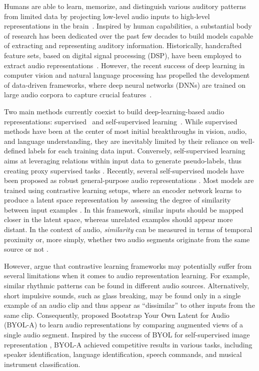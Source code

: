 

Humans are able to learn, memorize, and distinguish various auditory patterns from limited data by projecting low-level audio inputs to high-level representations in the brain~\citep{griffiths1999human}. Inspired by human capabilities, a substantial body of research has been dedicated over the past few decades to build models capable of extracting and representing auditory information. Historically, handcrafted feature sets, based on digital signal processing (DSP), have been employed to extract audio representations~\citep{liu1998audio, eyben2010opensmile}. However, the recent success of deep learning in computer vision and natural language processing has propelled the development of data-driven frameworks, where deep neural networks (DNNs) are trained on large audio corpora to capture crucial features~\citep{hershey2017cnn,van2018representation}.

Two main methods currently coexist to build deep-learning-based audio representations: supervised~\citep{hershey2017cnn, beckmann2021word} and
self-supervised learning~\citep{baevski2020,niizumi2021byol}. While supervised methods have been at the center of most initial breakthroughs in vision, audio, and language understanding, they are inevitably limited by their reliance on well-defined labels for each training data input. Conversely, self-supervised learning aims at leveraging relations within input data to generate pseudo-labels, thus creating proxy supervised tasks \citep{liu2021self, murphy2022}. Recently, several self-supervised models have been proposed as robust general-purpose audio representations \citep{van2018representation, shor2020towards, saeed2021contrastive, niizumi2021byol, shor2021universal}. Most models are trained using contrastive learning setups, where an encoder network learns to produce a latent space representation by assessing the degree of similarity between input examples \citep{van2018representation, shor2020towards, saeed2021contrastive}. In this framework, similar inputs should be mapped closer in the latent space, whereas unrelated examples should appear more distant. In the context of audio, \textit{similarity} can be measured in terms of temporal proximity \citep{shor2020towards} or, more simply, whether two audio segments originate from the same source or not \citep{saeed2021contrastive}.

However, \citet{niizumi2021byol} argue that contrastive learning frameworks may potentially suffer from several limitations when it comes to audio representation learning. For example, similar rhythmic patterns can be found in different audio sources. Alternatively, short impulsive sounds, such as glass breaking, may be found only in a single example of an audio clip and thus appear as “dissimilar” to other inputs from the same clip. Consequently, \citet{niizumi2021byol} proposed Bootstrap Your Own Latent for Audio (BYOL-A) to learn audio representations by comparing augmented views of a single audio segment. Inspired by the success of BYOL for self-supervised image representation \citep{grill2020}, BYOL-A achieved competitive results in various tasks, including speaker identification, language identification, speech commands, and musical instrument classification.

